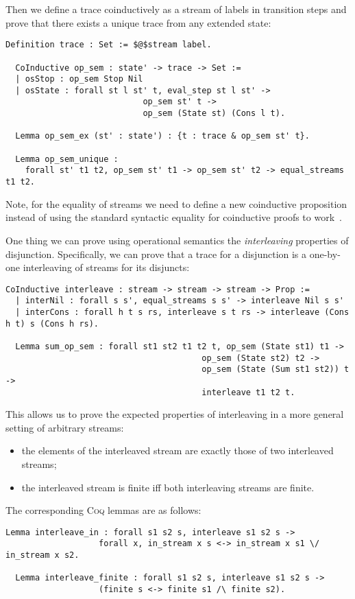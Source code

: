 Then we define a trace coinductively as a stream of labels in transition steps and prove that there exists a unique trace from any extended state:

\begin{lstlisting}[language=Coq]
  Definition trace : Set := $@$stream label.

  CoInductive op_sem : state' -> trace -> Set :=
  | osStop : op_sem Stop Nil
  | osState : forall st l st' t, eval_step st l st' ->
                            op_sem st' t ->
                            op_sem (State st) (Cons l t).

  Lemma op_sem_ex (st' : state') : {t : trace & op_sem st' t}.

  Lemma op_sem_unique :
    forall st' t1 t2, op_sem st' t1 -> op_sem st' t2 -> equal_streams t1 t2.
\end{lstlisting}

Note, for the equality of streams we need to define a new coinductive proposition instead of using the standard syntactic equality for coinductive proofs to work~\cite{CPDT}.

One thing we can prove using operational semantics the \emph{interleaving} properties of disjunction. Specifically, we can prove that a trace for a disjunction is
a one-by-one interleaving of streams for its disjuncts:

\begin{lstlisting}[language=Coq]
  CoInductive interleave : stream -> stream -> stream -> Prop :=
  | interNil : forall s s', equal_streams s s' -> interleave Nil s s'
  | interCons : forall h t s rs, interleave s t rs -> interleave (Cons h t) s (Cons h rs).

  Lemma sum_op_sem : forall st1 st2 t1 t2 t, op_sem (State st1) t1 ->
                                        op_sem (State st2) t2 ->
                                        op_sem (State (Sum st1 st2)) t ->
                                        interleave t1 t2 t.
\end{lstlisting}

This allows us to prove the expected properties of interleaving in a more general setting of arbitrary streams:

\begin{itemize}
\item  the elements of the interleaved stream are exactly those of two interleaved streams;
\item  the interleaved stream is finite iff both interleaving streams are finite.
\end{itemize}

The corresponding \textsc{Coq} lemmas are as follows:

\begin{lstlisting}[language=Coq]
  Lemma interleave_in : forall s1 s2 s, interleave s1 s2 s ->
                   forall x, in_stream x s <-> in_stream x s1 \/ in_stream x s2.

  Lemma interleave_finite : forall s1 s2 s, interleave s1 s2 s ->
                   (finite s <-> finite s1 /\ finite s2).
\end{lstlisting}
